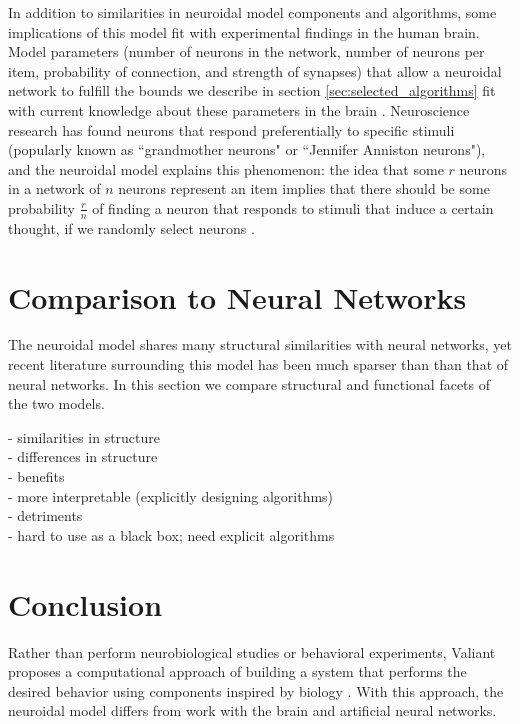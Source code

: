 \documentclass[letterpaper, 12pt]{article}
\begin{document}
In addition to similarities in neuroidal model components and algorithms, some implications of this model fit with experimental findings in the human brain. Model parameters (number of neurons in the network, number of neurons per item, probability of connection, and strength of synapses) that allow a neuroidal network to fulfill the bounds we describe in section \ref{sec:selected_algorithms} fit with current knowledge about these parameters in the brain \cite{valiant_memorization_2005, valiant_quantitative_2006}. Neuroscience research has found neurons that respond preferentially to specific stimuli (popularly known as ``grandmother neurons" or ``Jennifer Anniston neurons"), and the neuroidal model explains this phenomenon: the idea that some $r$ neurons in a network of $n$ neurons represent an item implies that there should be some probability $\frac{r}{n}$ of finding a neuron that responds to stimuli that induce a certain thought, if we randomly select neurons \cite{quiroga_invariant_2005, valiant_quantitative_2006}.

\section{Comparison to Neural Networks}
The neuroidal model shares many structural similarities with neural networks, yet recent literature surrounding this model has been much sparser than than that of neural networks. In this section we compare structural and functional facets of the two models.

- similarities in structure\\
- differences in structure\\
- benefits\\
	- more interpretable (explicitly designing algorithms)\\
- detriments\\
	- hard to use as a black box; need explicit algorithms\\

\section{Conclusion}
Rather than perform neurobiological studies or behavioral experiments, Valiant proposes a computational approach of building a system that performs the desired behavior using components inspired by biology \cite{valiant_circuits_1994}. With this approach, the neuroidal model differs from work with the brain and artificial neural networks.
\end{document}
